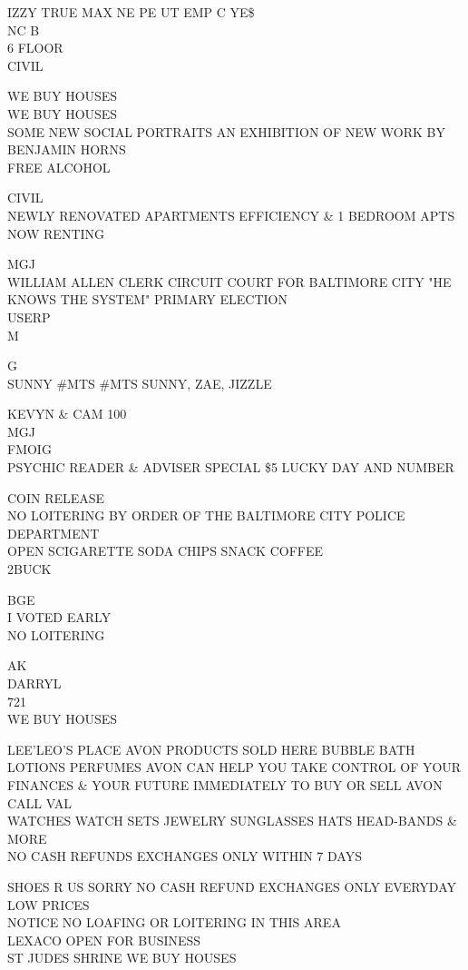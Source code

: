 \documentclass[10pt,letterpaper]{article}
\begin{document}
IZZY TRUE MAX NE PE UT EMP C YE\$\\
NC B\\
6 FLOOR\\
CIVIL

WE BUY HOUSES\\
WE BUY HOUSES\\
SOME NEW SOCIAL PORTRAITS AN EXHIBITION OF NEW WORK BY BENJAMIN HORNS\\
FREE ALCOHOL

CIVIL\\
NEWLY RENOVATED APARTMENTS EFFICIENCY \& 1 BEDROOM APTS NOW RENTING

MGJ\\
WILLIAM ALLEN CLERK CIRCUIT COURT FOR BALTIMORE CITY "HE KNOWS THE SYSTEM" PRIMARY ELECTION\\
USERP\\
M

G\\
SUNNY \#MTS \#MTS SUNNY, ZAE, JIZZLE

KEVYN \& CAM 100\\
MGJ\\
FMOIG\\
PSYCHIC READER \& ADVISER SPECIAL \$5 LUCKY DAY AND NUMBER

COIN RELEASE\\
NO LOITERING BY ORDER OF THE BALTIMORE CITY POLICE DEPARTMENT\\
OPEN SCIGARETTE SODA CHIPS SNACK COFFEE\\
2BUCK

BGE\\
I VOTED EARLY\\
NO LOITERING

AK\\
DARRYL\\
721\\
WE BUY HOUSES

LEE'LEO'S PLACE AVON PRODUCTS SOLD HERE BUBBLE BATH LOTIONS PERFUMES AVON CAN HELP YOU TAKE CONTROL OF YOUR FINANCES \& YOUR FUTURE IMMEDIATELY TO BUY OR SELL AVON CALL VAL\\
WATCHES WATCH SETS JEWELRY SUNGLASSES HATS HEAD{-}BANDS \& MORE\\
NO CASH REFUNDS EXCHANGES ONLY WITHIN 7 DAYS

SHOES R US SORRY NO CASH REFUND EXCHANGES ONLY EVERYDAY LOW PRICES\\
NOTICE NO LOAFING OR LOITERING IN THIS AREA\\
LEXACO OPEN FOR BUSINESS\\
ST JUDES SHRINE WE BUY HOUSES
\end{document}
